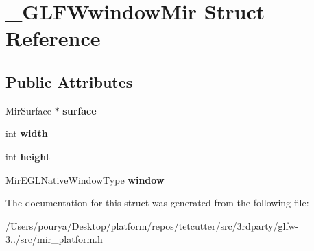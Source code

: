 \hypertarget{struct__GLFWwindowMir}{}\section{\+\_\+\+G\+L\+F\+Wwindow\+Mir Struct Reference}
\label{struct__GLFWwindowMir}
\subsection*{Public Attributes}
\begin{DoxyCompactItemize}
\item 
\hypertarget{struct__GLFWwindowMir_a13171cb3764bf73c94ade248de4b2ca9}{}Mir\+Surface $\ast$ {\bfseries surface}\label{struct__GLFWwindowMir_a13171cb3764bf73c94ade248de4b2ca9}

\item 
\hypertarget{struct__GLFWwindowMir_acb6df8cf61573261f878ee179e4d37de}{}int {\bfseries width}\label{struct__GLFWwindowMir_acb6df8cf61573261f878ee179e4d37de}

\item 
\hypertarget{struct__GLFWwindowMir_a196047dc89883b56e9692abcbad52b3d}{}int {\bfseries height}\label{struct__GLFWwindowMir_a196047dc89883b56e9692abcbad52b3d}

\item 
\hypertarget{struct__GLFWwindowMir_adbe78193f56f6b4bc0c51bfbd7c1f4d3}{}Mir\+E\+G\+L\+Native\+Window\+Type {\bfseries window}\label{struct__GLFWwindowMir_adbe78193f56f6b4bc0c51bfbd7c1f4d3}

\end{DoxyCompactItemize}


The documentation for this struct was generated from the following file\+:\begin{DoxyCompactItemize}
\item 
/\+Users/pourya/\+Desktop/platform/repos/tetcutter/src/3rdparty/glfw-\/3../src/mir\+\_\+platform.\+h\end{DoxyCompactItemize}
